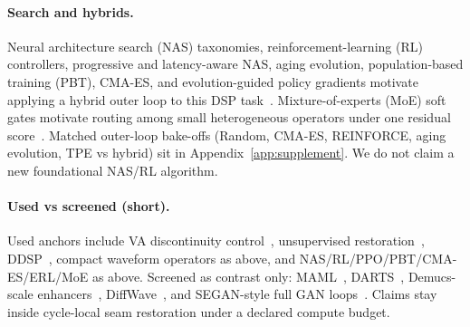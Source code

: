 \paragraph{Search and hybrids.}
Neural architecture search (NAS) taxonomies, reinforcement-learning (RL) controllers, progressive and latency-aware NAS, aging evolution, population-based training (PBT), CMA-ES, and evolution-guided policy gradients motivate applying a hybrid outer loop to this DSP task~\cite{elsken2019,zoph2017nas,pham2018,liu2018pnas,tan2019mnasnet,real2019,jaderberg2017,hansen2016cmaes,khadka2018,schulman2017}.
Mixture-of-experts (MoE) soft gates motivate routing among small heterogeneous operators under one residual score~\cite{shazeer2017}.
Matched outer-loop bake-offs (Random, CMA-ES, REINFORCE, aging evolution, TPE vs hybrid) sit in Appendix~\ref{app:supplement}.
We do not claim a new foundational NAS/RL algorithm.

\paragraph{Used vs screened (short).}
Used anchors include VA discontinuity control~\cite{stilson1996,esqueda2016blamp,nam2009polyblep}, unsupervised restoration~\cite{lehtinen2018,kashyap2021n2n,wisdom2020}, DDSP~\cite{engel2020}, compact waveform operators as above, and NAS/RL/PPO/PBT/CMA-ES/ERL/MoE as above.
Screened as contrast only: MAML~\cite{finn2017}, DARTS~\cite{liu2019}, Demucs-scale enhancers~\cite{dfossez2019,dfossez2021}, DiffWave~\cite{kong2021}, and SEGAN-style full GAN loops~\cite{pascual2017}.
Claims stay inside cycle-local seam restoration under a declared compute budget.
